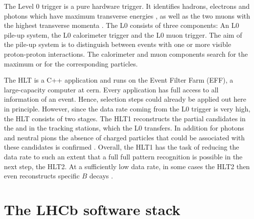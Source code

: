 The Level 0 trigger is a pure hardware trigger.
It identifies hadrons, electrons and photons which have maximum transverse energies \et, as well as the two muons with the highest transverse momenta \pt.
The L0 consists of three components: An L0 pile-up system, the L0 calorimeter trigger and the L0 muon trigger.
The aim of the pile-up system is to distinguish between events with one or more visible proton-proton interactions.
The calorimeter and muon components search for the maximum \et or \pt for the corresponding particles.

The HLT is a C++ application and runs on the Event Filter Farm (EFF), a large-capacity computer at cern.
Every application has full access to all information of an event.
Hence, selection steps could already be applied out here in principle.
However, since the data rate coming from the L0 trigger is very high, the HLT consists of two stages.
The HLT1 reconstructs the partial candidates in the \velo and in the tracking stations, which the L0 transfers.
In addition for photons and neutral pions the absence of charged particles that could be associated with these candidates is confirmed .
Overall, the HLT1 has the task of reducing the data rate to such an extent that a full full pattern recognition is possible in the next step, the HLT2.
At a sufficiently low data rate, in some cases the HLT2 then even reconstructs specific $B$ decays .

\section{The LHCb software stack}


